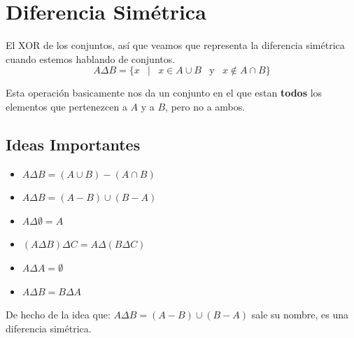 \documentclass[12pt, fleqn]{report}                             %
\DeclareMathOperator \Space     {\quad}                         %
\DeclareMathOperator \MiniSpace {\;}                            %
\newcommand \Such           {\MiniSpace | \MiniSpace}           %
\newcommand \Also           {\MiniSpace \text{y} \MiniSpace}    %
\theoremstyle{break}                                            %
\begin{document}
        \clearpage
        \section{Diferencia Simétrica}

            El XOR de los conjuntos, así que veamos que representa la diferencia simétrica cuando estemos
            hablando de conjuntos.
            \begin{equation*}
                A \Delta B = \{ x \Such x \in A \cup B \Also  x \notin A \cap B \}
            \end{equation*}

            Esta operación basicamente nos da un conjunto en el que estan \textbf{todos} los elementos
            que pertenezcen a $A$ y a $B$, pero no a ambos.

            \subsection{Ideas Importantes}

                \begin{itemize}
                    \item $A \Delta B = (A \cup B) - ( A \cap B)$

                    \item $A \Delta B = (A - B) \cup ( B - A)$

                    \item $A \Delta \emptyset = A$

                    \item $(A \Delta B) \Delta C = A \Delta (B \Delta C)$

                    \item $A \Delta A = \emptyset$

                    \item $A \Delta B = B \Delta A$

                \end{itemize}

            De hecho de la idea que: $A \Delta B = (A - B) \cup ( B - A)$ sale su nombre, es una diferencia simétrica.
\end{document}
